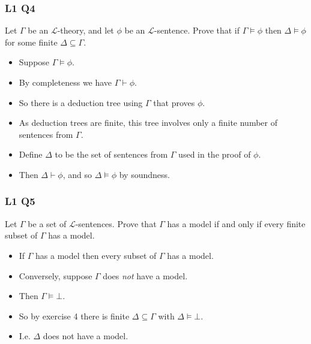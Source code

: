 \documentclass[handout]{beamer}
\newcommand{\sL}{\mathscr{L}}
\begin{document}
\begin{frame}
\frametitle{L1 Q4}
Let $\Gamma$ be an $\sL$-theory, and let $\phi$ be an $\sL$-sentence. Prove that if $\Gamma\models \phi$ then $\Delta\models \phi$ for some finite $\Delta\subseteq \Gamma$.\vspace{0.5cm}
\begin{itemize}
\item Suppose $\Gamma\models \phi$. \vspace{0.1cm}
\item By completeness we have $\Gamma\vdash \phi$. \vspace{0.1cm}
\item So there is a deduction tree using $\Gamma$ that proves $\phi$. \vspace{0.1cm}
\item As deduction trees are finite, this tree involves only a finite number of sentences from $\Gamma$. \vspace{0.1cm}
\item Define $\Delta$ to be the set of sentences from $\Gamma$ used in the proof of $\phi$. \vspace{0.1cm}
\item Then $\Delta\vdash \phi$, and so $\Delta\models \phi$ by soundness. 
\end{itemize}
\end{frame}

\begin{frame}
\frametitle{L1 Q5}
Let $\Gamma$ be a set of $\sL$-sentences. Prove that $\Gamma$ has a model if and only if every finite subset of $\Gamma$ has a model. \vspace{0.5cm}
\begin{itemize}
\item If $\Gamma$ has a model then every subset of $\Gamma$ has a model. \vspace{0.2cm}
\item Conversely, suppose $\Gamma$ does \emph{not} have a model. \vspace{0.2cm}
\item Then $\Gamma\models \bot$. \vspace{0.2cm}
\item So by exercise 4 there is finite $\Delta\subseteq \Gamma$ with $\Delta\models \bot$. \vspace{0.2cm}
\item I.e. $\Delta$ does not have a model. 
\end{itemize}
\end{frame}
\end{document}
